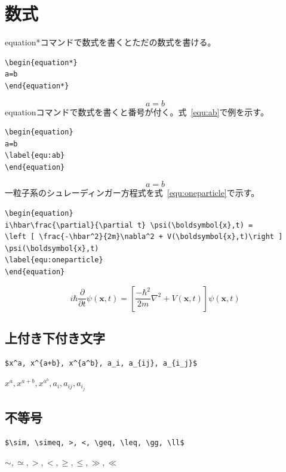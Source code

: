\documentclass[a4j]{jsarticle}
\begin{document}
\section{数式}
equation*コマンドで数式を書くとただの数式を書ける。
\begin{verbatim}
\begin{equation*}
a=b
\end{equation*}
\end{verbatim}
\begin{equation*}
a=b
\end{equation*}
equationコマンドで数式を書くと番号が付く。式~\ref{equ:ab}で例を示す。
\begin{verbatim}
\begin{equation}
a=b
\label{equ:ab}
\end{equation}
\end{verbatim}
\begin{equation}
a=b
\label{equ:ab}
\end{equation}
一粒子系のシュレーディンガー方程式を式~\ref{equ:oneparticle}で示す。
\begin{verbatim}
\begin{equation}
i\hbar\frac{\partial}{\partial t} \psi(\boldsymbol{x},t) = 
\left [ \frac{-\hbar^2}{2m}\nabla^2 + V(\boldsymbol{x},t)\right ] \psi(\boldsymbol{x},t)
\label{equ:oneparticle}
\end{equation}
\end{verbatim}
\begin{equation}
i\hbar\frac{\partial}{\partial t} \psi(\boldsymbol{x},t) = 
\left [ \frac{-\hbar^2}{2m}\nabla^2 + V(\boldsymbol{x},t)\right ] \psi(\boldsymbol{x},t)
\label{equ:oneparticle}
\end{equation}

\subsection{上付き下付き文字}
\begin{verbatim}
$x^a, x^{a+b}, x^{a^b}, a_i, a_{ij}, a_{i_j}$
\end{verbatim}
$x^a, x^{a+b}, x^{a^b}, a_i, a_{ij}, a_{i_j}$

\subsection{不等号}
\begin{verbatim}
$\sim, \simeq, >, <, \geq, \leq, \gg, \ll$
\end{verbatim}
$\sim, \simeq, >, <, \geq, \leq, \gg, \ll$
\end{document}
